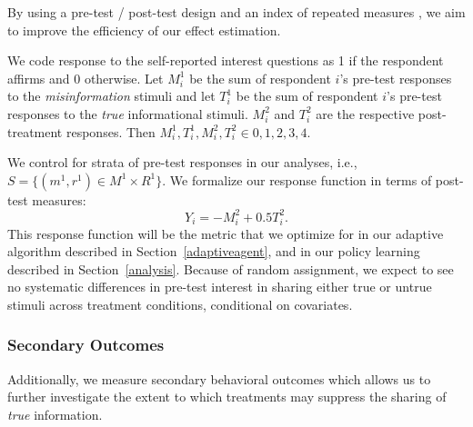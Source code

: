 \documentclass[letterpaper, 12pt, parskip=full,]{scrartcl}
\begin{document}
By using a pre-test / post-test design  \citep{davidian2005semiparametric} %
and an index of repeated measures \citep{broockman2017design}, we aim to improve the efficiency of our effect estimation. 


We code response to the self-reported interest questions as 1 if the respondent affirms and 0 otherwise. Let $M_i^1$ be the sum of respondent $i$'s pre-test responses to the \textit{misinformation} stimuli and let $T_i^1$ be the sum of respondent $i$'s pre-test responses to the \textit{true} informational stimuli. $M_i^2$ and $T_i^2$ are the respective post-treatment responses. Then $M_i^1, T_i^1, M_i^2, T_i^2 \in {0,1,2, 3, 4}$. 

We control for strata of pre-test responses in our analyses, i.e., $S=\{(m^1, r^1)\in M^1 \times R^1\}$. 
We formalize our response function in terms of post-test measures:
\[
Y_i = -M^2_i + 0.5 T^2_i.
\]
This response function will be the metric that we optimize for in our adaptive algorithm described in Section~\ref{adaptiveagent}, and in our policy learning described in Section~\ref{analysis}. Because of random assignment, we expect to see no systematic differences in pre-test interest in sharing either true or untrue stimuli across treatment conditions, conditional on covariates. %




\subsubsection{Secondary Outcomes}
Additionally, we measure secondary behavioral outcomes which allows us to further investigate the extent to which treatments may suppress the sharing of \textit{true} information.
\end{document}
